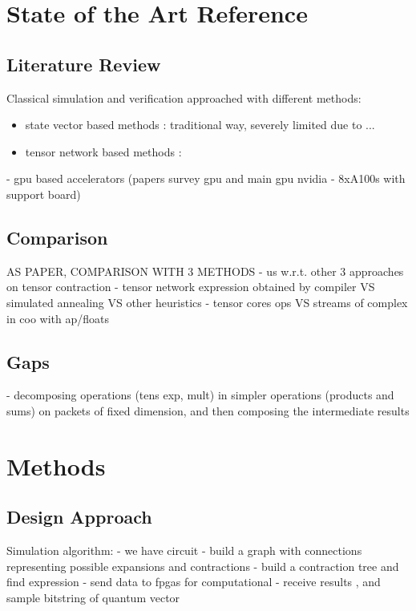 \documentclass[12pt,oneside,a4paper]{article}
\begin{document}
\section{State of the Art Reference}

\subsection{Literature Review}
Classical simulation and verification approached with different methods:
\begin{itemize}
	\item state vector based methods : traditional way, severely limited due to ...
	\item tensor network based methods :
\end{itemize}

- gpu based accelerators (papers survey gpu and main gpu nvidia - 8xA100s with support board)

\subsection{Comparison}
AS PAPER, COMPARISON WITH 3 METHODS
- us w.r.t. other 3 approaches on tensor contraction
- tensor network expression obtained by compiler VS simulated annealing VS other heuristics
- tensor cores ops VS streams of complex in coo with ap/floats

\subsection{Gaps}
- decomposing operations (tens exp, mult) in simpler operations (products and sums) on packets of fixed dimension, and then composing the intermediate results





\section{Methods}

\subsection{Design Approach}
Simulation algorithm:
- we have circuit
- build a graph with connections representing possible expansions and contractions
- build a contraction tree and find expression
- send data to fpgas for computational
- receive results , and sample bitstring of quantum vector
\end{document}
